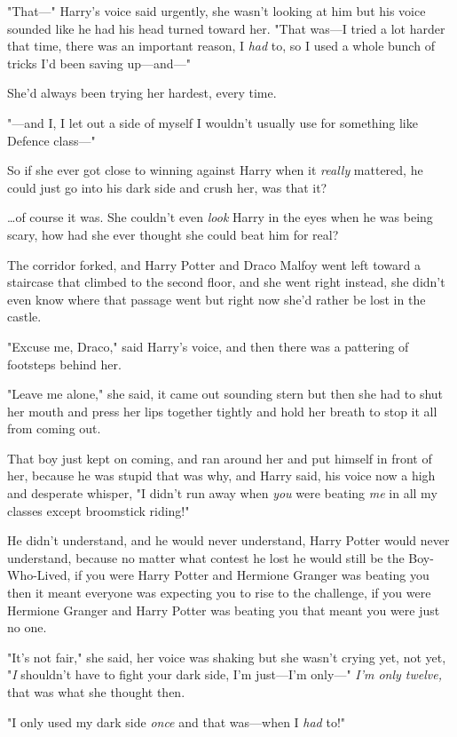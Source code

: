 "That---" Harry's voice said urgently, she wasn't looking at him but his voice
sounded like he had his head turned toward her. "That was---I tried a lot
harder that time, there was an important reason, I \emph{had} to, so I used a
whole bunch of tricks I'd been saving up---and---"

She'd always been trying her hardest, every time.

"---and I, I let out a side of myself I wouldn't usually use for something like
Defence class---"

So if she ever got close to winning against Harry when it \emph{really}
mattered, he could just go into his dark side and crush her, was that it?

…of course it was. She couldn't even \emph{look} Harry in the eyes when
he was being scary, how had she ever thought she could beat him for real?

The corridor forked, and Harry Potter and Draco Malfoy went left toward a
staircase that climbed to the second floor, and she went right instead, she
didn't even know where that passage went but right now she'd rather be lost in
the castle.

"Excuse me, Draco," said Harry's voice, and then there was a pattering of
footsteps behind her.

"Leave me alone," she said, it came out sounding stern but then she had to shut
her mouth and press her lips together tightly and hold her breath to stop it
all from coming out.

That boy just kept on coming, and ran around her and put himself in front of
her, because he was stupid that was why, and Harry said, his voice now a high
and desperate whisper, "I didn't run away when \emph{you} were beating
\emph{me} in all my classes except broomstick riding!"

He didn't understand, and he would never understand, Harry Potter would never
understand, because no matter what contest he lost he would still be the
Boy-Who-Lived, if you were Harry Potter and Hermione Granger was beating you
then it meant everyone was expecting you to rise to the challenge, if you were
Hermione Granger and Harry Potter was beating you that meant you were just no
one.

"It's not fair," she said, her voice was shaking but she wasn't crying yet, not
yet, "\emph{I} shouldn't have to fight your dark side, I'm just---I'm only---"
\emph{I'm only twelve,} that was what she thought then.

"I only used my dark side \emph{once} and that was---when I \emph{had} to!"

